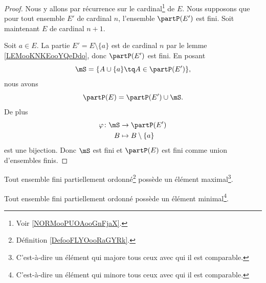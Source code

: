 \begin{proof}
	Nous y allons par récurrence sur le cardinal\footnote{Voir \ref{NORMooPUOAooGnFjaX}.} de \( E\). Nous supposons que pour tout ensemble \( E'\) de cardinal \( n\), l'ensemble \( \partP(E')\) est fini. Soit maintenant \( E\) de cardinal \( n+1\).

	Soit \( a\in E\). La partie \( E'=E\setminus \{ a \}\) est de cardinal \( n\) par le lemme \ref{LEMooKNKEooYQeDdo}, donc \( \partP(E')\) est fini. En posant
	\begin{equation}
		\mS=\{ A\cup\{ a \}\tq A\in\partP(E') \},
	\end{equation}
	nous avons
	\begin{equation}
		\partP(E)=\partP(E')\cup \mS.
	\end{equation}
	De plus
	\begin{equation}
		\begin{aligned}
			\varphi\colon \mS & \to \partP(E')            \\
			B                 & \mapsto B\setminus\{ a \}
		\end{aligned}
	\end{equation}
	est une bijection. Donc \( \mS\) est fini et \( \partP(E)\) est fini comme union d'ensembles finis.
\end{proof}


\begin{proposition}	\label{PROPooGJLYooTQtlSV}
	Tout ensemble fini partiellement ordonné\footnote{Définition \ref{DefooFLYOooRaGYRk}.} possède un élément maximal\footnote{C'est-à-dire un élément qui majore tous ceux avec qui il est comparable.}.

	Tout ensemble fini partiellement ordonné possède un élément minimal\footnote{C'est-à-dire un élément qui minore tous ceux avec qui il est comparable.}.
\end{proposition}

